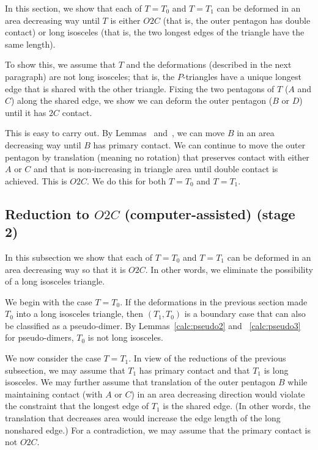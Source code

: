 In this section, we show that each of $T=T_0$ and $T=T_1$ can be
deformed in an area decreasing way until $T$ is either $O2C$ (that is,
the outer pentagon has double contact) or long isosceles (that is, the
two longest edges of the triangle have the same length).

To show this, we assume that $T$ and the deformations (described
in the next paragraph) are not long
isosceles; that is, the $P$-triangles have a unique longest edge
that is shared with the other triangle.  Fixing the two pentagons of
$T$ ($A$ and $C$) along the shared edge, we show we can deform the
outer pentagon ($B$ or $D$) until it has $2C$ contact.

This is easy to carry out.  By Lemmas~
and~, we can move $B$ in an area decreasing way
until $B$ has primary contact.  We can continue to move the outer
pentagon by translation (meaning no rotation) that preserves contact
with either $A$ or $C$ and that is non-increasing in triangle area
until double contact is achieved.  This is $O2C$.  We do this for both
$T=T_0$ and $T=T_1$.

\subsection{Reduction to $O2C$ (computer-assisted) (stage 2)}

In this subsection we show that each of $T=T_0$ and $T=T_1$ can be
deformed in an area decreasing way so that it is $O2C$.
In other words, we eliminate the possibility of a long isosceles triangle.

We begin with the case $T=T_0$.  If the deformations in the previous
section made $T_0$ into a long isosceles triangle, then $(T_1,T_0)$ is
a boundary case that can also be classified as a pseudo-dimer.  By
Lemmas~\ref{calc:pseudo2} and ~\ref{calc:pseudo3} for pseudo-dimers,
$T_0$ is not long isosceles.

We now consider the case $T=T_1$.  In view of the reductions of the
previous subsection, we may assume that $T_1$ has primary contact and
that $T_1$ is long isosceles.  We may further assume that translation
of the outer pentagon $B$ while maintaining contact (with  $A$ or $C$)
in an area decreasing direction would violate the constraint that the
longest edge of $T_1$ is the shared edge.  (In other words, the
translation that decreases area would increase the edge length of the
long nonshared edge.)  For a contradiction, we may assume that the
primary contact is not $O2C$.

